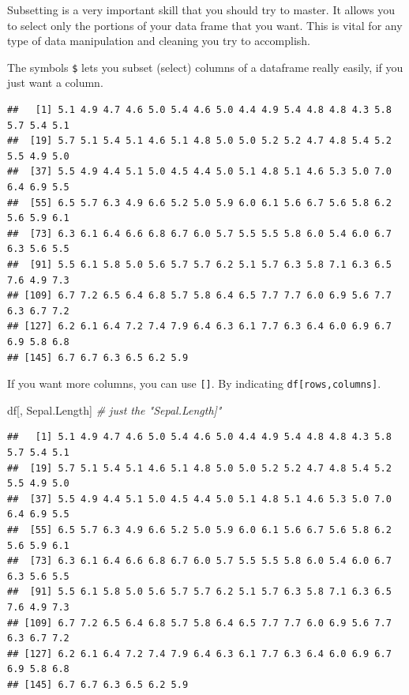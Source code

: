 \documentclass[
]{book}
\newenvironment{Shaded}{\begin{snugshade}}{\end{snugshade}}
\newcommand{\CommentTok}[1]{\textcolor[rgb]{0.56,0.35,0.01}{\textit{#1}}}
\newcommand{\NormalTok}[1]{#1}
\newcommand{\OtherTok}[1]{\textcolor[rgb]{0.56,0.35,0.01}{#1}}
\newcommand{\SpecialCharTok}[1]{\textcolor[rgb]{0.00,0.00,0.00}{#1}}
\newcommand{\StringTok}[1]{\textcolor[rgb]{0.31,0.60,0.02}{#1}}
\begin{document}
Subsetting is a very important skill that you should try to master.
It allows you to select only the portions of your data frame that you want.
This is vital for any type of data manipulation and cleaning you try to accomplish.

The symbols \texttt{\$} lets you subset (select) columns of a dataframe really easily, if you just want a column.

\begin{Shaded}
\end{Shaded}

\begin{verbatim}
##   [1] 5.1 4.9 4.7 4.6 5.0 5.4 4.6 5.0 4.4 4.9 5.4 4.8 4.8 4.3 5.8 5.7 5.4 5.1
##  [19] 5.7 5.1 5.4 5.1 4.6 5.1 4.8 5.0 5.0 5.2 5.2 4.7 4.8 5.4 5.2 5.5 4.9 5.0
##  [37] 5.5 4.9 4.4 5.1 5.0 4.5 4.4 5.0 5.1 4.8 5.1 4.6 5.3 5.0 7.0 6.4 6.9 5.5
##  [55] 6.5 5.7 6.3 4.9 6.6 5.2 5.0 5.9 6.0 6.1 5.6 6.7 5.6 5.8 6.2 5.6 5.9 6.1
##  [73] 6.3 6.1 6.4 6.6 6.8 6.7 6.0 5.7 5.5 5.5 5.8 6.0 5.4 6.0 6.7 6.3 5.6 5.5
##  [91] 5.5 6.1 5.8 5.0 5.6 5.7 5.7 6.2 5.1 5.7 6.3 5.8 7.1 6.3 6.5 7.6 4.9 7.3
## [109] 6.7 7.2 6.5 6.4 6.8 5.7 5.8 6.4 6.5 7.7 7.7 6.0 6.9 5.6 7.7 6.3 6.7 7.2
## [127] 6.2 6.1 6.4 7.2 7.4 7.9 6.4 6.3 6.1 7.7 6.3 6.4 6.0 6.9 6.7 6.9 5.8 6.8
## [145] 6.7 6.7 6.3 6.5 6.2 5.9
\end{verbatim}

If you want more columns, you can use \texttt{{[}{]}}.
By indicating \texttt{df{[}rows,columns{]}}.

\begin{Shaded}
\begin{Highlighting}[]
\NormalTok{df[, }\StringTok{\textquotesingle{}Sepal.Length\textquotesingle{}}\NormalTok{]  }\CommentTok{\# just the "Sepal.Length]"}
\end{Highlighting}
\end{Shaded}

\begin{verbatim}
##   [1] 5.1 4.9 4.7 4.6 5.0 5.4 4.6 5.0 4.4 4.9 5.4 4.8 4.8 4.3 5.8 5.7 5.4 5.1
##  [19] 5.7 5.1 5.4 5.1 4.6 5.1 4.8 5.0 5.0 5.2 5.2 4.7 4.8 5.4 5.2 5.5 4.9 5.0
##  [37] 5.5 4.9 4.4 5.1 5.0 4.5 4.4 5.0 5.1 4.8 5.1 4.6 5.3 5.0 7.0 6.4 6.9 5.5
##  [55] 6.5 5.7 6.3 4.9 6.6 5.2 5.0 5.9 6.0 6.1 5.6 6.7 5.6 5.8 6.2 5.6 5.9 6.1
##  [73] 6.3 6.1 6.4 6.6 6.8 6.7 6.0 5.7 5.5 5.5 5.8 6.0 5.4 6.0 6.7 6.3 5.6 5.5
##  [91] 5.5 6.1 5.8 5.0 5.6 5.7 5.7 6.2 5.1 5.7 6.3 5.8 7.1 6.3 6.5 7.6 4.9 7.3
## [109] 6.7 7.2 6.5 6.4 6.8 5.7 5.8 6.4 6.5 7.7 7.7 6.0 6.9 5.6 7.7 6.3 6.7 7.2
## [127] 6.2 6.1 6.4 7.2 7.4 7.9 6.4 6.3 6.1 7.7 6.3 6.4 6.0 6.9 6.7 6.9 5.8 6.8
## [145] 6.7 6.7 6.3 6.5 6.2 5.9
\end{verbatim}
\end{document}
